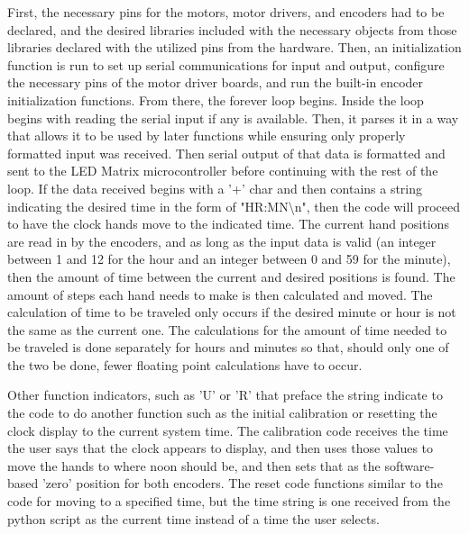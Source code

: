 \documentclass[11pt]{article}
\begin{document}
First, the necessary pins for the motors, motor drivers, and encoders had to be declared, and the desired libraries included with the necessary objects from those libraries declared with the utilized pins from the hardware. Then, an initialization function is run to set up serial communications for input and output, configure the necessary pins of the motor driver boards, and run the built-in encoder initialization functions. From there, the forever loop begins. Inside the loop begins with reading the serial input if any is available. Then, it parses it in a way that allows it to be used by later functions while ensuring only properly formatted input was received. Then serial output of that data is formatted and sent to the LED Matrix microcontroller before continuing with the rest of the loop. If the data received begins with a '+' char and then contains a string indicating the desired time in the form of "HR:MN\textbackslash{n}", then the code will proceed to have the clock hands move to the indicated time. The current hand positions are read in by the encoders, and as long as the input data is valid (an integer between 1 and 12 for the hour and an integer between 0 and 59 for the minute), then the amount of time between the current and desired positions is found. The amount of steps each hand needs to make is then calculated and moved. The calculation of time to be traveled only occurs if the desired minute or hour is not the same as the current one. The calculations for the amount of time needed to be traveled is done separately for hours and minutes so that, should only one of the two be done, fewer floating point calculations have to occur. 

Other function indicators, such as 'U' or 'R' that preface the string indicate to the code to do another function such as the initial calibration or resetting the clock display to the current system time. The calibration code receives the time the user says that the clock appears to display, and then uses those values to move the hands to where noon should be, and then sets that as the software-based 'zero' position for both encoders. The reset code functions similar to the code for moving to a specified time, but the time string is one received from the python script as the current time instead of a time the user selects. 

\end{document}
